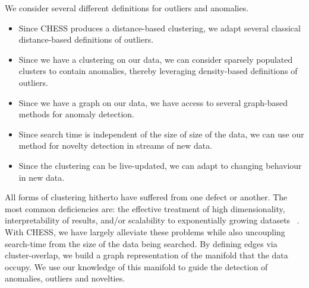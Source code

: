 We consider several different definitions for outliers and anomalies.
\begin{itemize}
    \item Since CHESS produces a distance-based clustering, we adapt several classical distance-based definitions of outliers.
    \item Since we have a clustering on our data, we can consider sparsely populated clusters to contain anomalies, thereby leveraging density-based definitions of outliers.
    \item Since we have a graph on our data, we have access to several graph-based methods for anomaly detection.
    \item Since search time is independent of the size of size of the data, we can use our method for novelty detection in streams of new data.
    \item Since the clustering can be live-updated, we can adapt to changing behaviour in new data.
\end{itemize}

All forms of clustering hitherto have suffered from one defect or another.
The most common deficiencies are: the effective treatment of high dimensionality, interpretability of results, and/or scalability to exponentially growing datasets ~\cite{rakesh_agrawal_automatic_1998}.
With CHESS, we have largely alleviate these problems while also uncoupling search-time from the size of the data being searched.
By defining edges via cluster-overlap, we build a graph representation of the manifold that the data occupy.
We use our knowledge of this manifold to guide the detection of anomalies, outliers and novelties.

